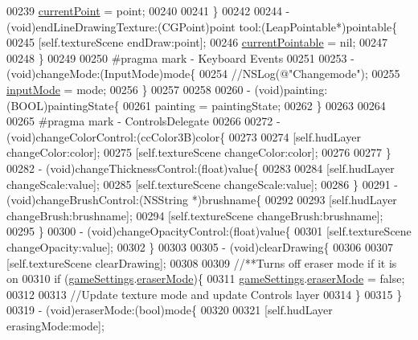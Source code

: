 \begin{DoxyCode}
{{00239     \hyperlink{interface_game_manager_a880d3cc994cc208b57a97fac088c2781}{currentPoint} = point;
00240     
00241 \}
00242 
00244 - (void)endLineDrawingTexture:(CGPoint)point tool:(LeapPointable*)pointable\{
00245     [\textcolor{keyword}{self}.textureScene endDraw:point];
00246     \hyperlink{interface_game_manager_a9899e94be0e9364a59e5b76d5025d9f7}{currentPointable} = nil;
00247     
00248 \}
00249 
00250 \textcolor{preprocessor}{#pragma mark - Keyboard Events}
00251 \textcolor{preprocessor}{}
00253 - (void)changeMode:(InputMode)mode\{
00254     \textcolor{comment}{//NSLog(@"Changemode");}
00255     \hyperlink{interface_game_manager_a43f8cf09eea5b0766c73b0d2b258644c}{inputMode} = mode;
00256 \}
00257 
00258 
00260 - (void)painting:(BOOL)paintingState\{
00261     painting = paintingState;
00262 \}
00263 
00264 
00265 \textcolor{preprocessor}{#pragma mark - ControlsDelegate}
00266 \textcolor{preprocessor}{}
00272 - (void)changeColorControl:(ccColor3B)color\{
00273     
00274     [\textcolor{keyword}{self}.hudLayer changeColor:color];
00275     [\textcolor{keyword}{self}.textureScene changeColor:color];
00276     
00277 \}
00282 - (void)changeThicknessControl:(\textcolor{keywordtype}{float})value\{
00283     
00284     [\textcolor{keyword}{self}.hudLayer changeScale:value];
00285     [\textcolor{keyword}{self}.textureScene changeScale:value];
00286 \}
00291 - (void)changeBrushControl:(NSString *)brushname\{
00292     
00293     [\textcolor{keyword}{self}.hudLayer changeBrush:brushname];
00294     [\textcolor{keyword}{self}.textureScene changeBrush:brushname];
00295 \}
00300 - (void)changeOpacityControl:(\textcolor{keywordtype}{float})value\{
00301     [\textcolor{keyword}{self}.textureScene changeOpacity:value];
00302 \}
00303 
00305 - (void)clearDrawing\{
00306     
00307     [\textcolor{keyword}{self}.textureScene clearDrawing];
00308     
00309     \textcolor{comment}{//**Turns off eraser mode if it is on}
00310     \textcolor{keywordflow}{if} (\hyperlink{interface_game_manager_a97ff3b8cd0cbc6baf6f5abe3bb3417ca}{gameSettings}.\hyperlink{interface_game_settings_ab192ff4717d84e69f4e3a32a4e38d6b8}{eraserMode})\{
00311         \hyperlink{interface_game_manager_a97ff3b8cd0cbc6baf6f5abe3bb3417ca}{gameSettings}.\hyperlink{interface_game_settings_ab192ff4717d84e69f4e3a32a4e38d6b8}{eraserMode} = \textcolor{keyword}{false};
00312         
00313         \textcolor{comment}{//Update texture mode and update Controls layer}
00314     \}
00315 \}
00319 - (void)eraserMode:(\textcolor{keywordtype}{bool})mode\{
00320     
00321     [\textcolor{keyword}{self}.hudLayer erasingMode:mode];
}}
\end{DoxyCode}
